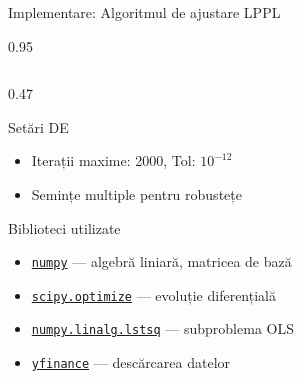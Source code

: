 \documentclass[9pt, aspectratio=169, t]{beamer}
\begin{document}
\begin{frame}{Implementare: Algoritmul de ajustare LPPL}
\begin{cminipage}{0.95\textwidth}
{\begin{columns}[T]
\begin{column}{0.47\textwidth}
\begin{alertblock}{Setări DE}
\begin{itemize}
                    \item Iterații maxime: 2000, Tol: $10^{-12}$
                    \item Semințe multiple pentru robustețe
                \end{itemize}
            \end{alertblock}
            \vspace{-1mm}
            \begin{block}{Biblioteci utilizate}
                \begin{itemize}\setlength{\itemsep}{0pt}
                    \item \href{https://numpy.org}{\texttt{numpy}} --- algebră liniară, matricea de bază
                    \item \href{https://docs.scipy.org/doc/scipy/reference/generated/scipy.optimize.differential\_evolution.html}{\texttt{scipy.optimize}} --- evoluție diferențială
                    \item \href{https://numpy.org/doc/stable/reference/generated/numpy.linalg.lstsq.html}{\texttt{numpy.linalg.lstsq}} --- subproblema OLS
                    \item \href{https://pypi.org/project/yfinance/}{\texttt{yfinance}} --- descărcarea datelor
                \end{itemize}
            \end{block}
        \end{column}
    \end{columns}
    }
    \hfill{}
    \end{cminipage}
\end{frame}

\end{document}
